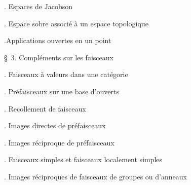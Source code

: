 \noindent{}. Espaces de Jacobson\dotfill

\noindent{}. Espace sobre associé à un espace topologique\dotfill

\noindent{}.Applications ouvertes en un point \dotfill

\noindent\quad \S\ 3. Compléments sur les faisceaux\dotfill

\noindent{}. Faisceaux à valeurs dans une catégorie\dotfill

\noindent{}. Préfaisceaux sur une base d'ouverts\dotfill

\noindent{}. Recollement de faisceaux\dotfill

\noindent{}. Images directes de préfaisceaux\dotfill

\noindent{}. Images réciproque de préfaisceaux\dotfill

\noindent{}. Faisceaux simples et faisceaux localement simples\dotfill

\noindent{}. Images réciproques de faisceaux de groupes ou d'anneaux\dotfill

\clearpage

